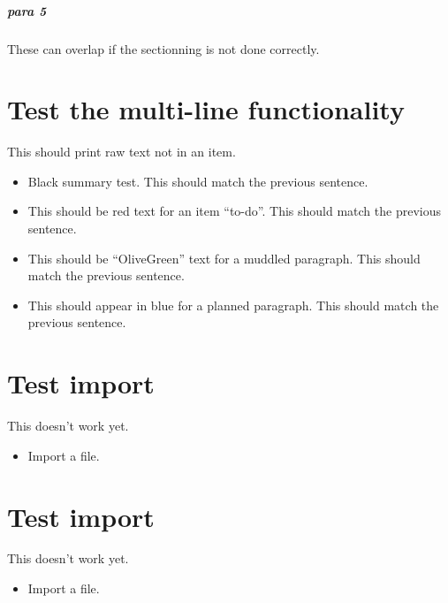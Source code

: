 \paragraph{para 5}
\label{autosec:7}
These can overlap if the sectionning is not done correctly.
\chapter{Test the multi-line functionality}
\label{autosec:7}
This should print raw text not in an item.
    \begin{itemize}[noitemsep]
        \item Black summary test.
This should match the previous sentence.
        \item {\color{red}This should be red text for an item ``to-do''.}
{\color{red}This should match the previous sentence.}
        \item {\color{OliveGreen}This should be ``OliveGreen'' text for a muddled paragraph.}
{\color{OliveGreen}This should match the previous sentence.}
        \item {\color{blue}This should appear in blue for a planned paragraph.}
{\color{blue}This should match the previous sentence.}
    \end{itemize}
\chapter{Test import}
\label{autosec:8}
This doesn't work yet.
    \begin{itemize}[noitemsep]
        \item {\color{red}Import a file.}
    \end{itemize}
\chapter{Test import}
\label{autosec:9}
This doesn't work yet.
    \begin{itemize}[noitemsep]
        \item {\color{red}Import a file.}
    \end{itemize}

